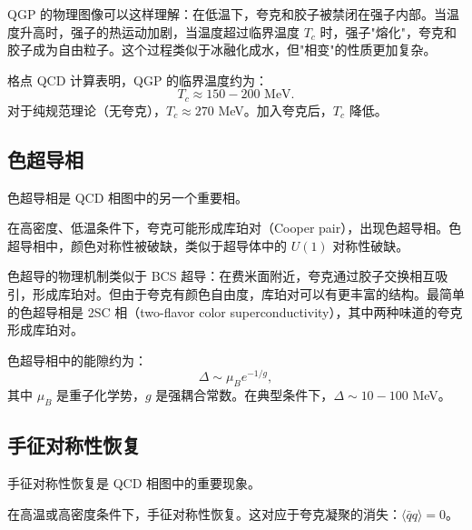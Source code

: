 \begin{remark}
QGP 的物理图像可以这样理解：在低温下，夸克和胶子被禁闭在强子内部。当温度升高时，强子的热运动加剧，当温度超过临界温度 $T_c$ 时，强子"熔化"，夸克和胶子成为自由粒子。这个过程类似于冰融化成水，但"相变"的性质更加复杂。
\end{remark}

\begin{proposition}
格点 QCD 计算表明，QGP 的临界温度约为：
\begin{equation}
    T_c \approx 150-200 \text{ MeV}.
\end{equation}
对于纯规范理论（无夸克），$T_c \approx 270$ MeV。加入夸克后，$T_c$ 降低。
\end{proposition}

\subsection{色超导相}

色超导相是 QCD 相图中的另一个重要相。

\begin{definition}[色超导]
在高密度、低温条件下，夸克可能形成库珀对（Cooper pair），出现色超导相。色超导相中，颜色对称性被破缺，类似于超导体中的 $U(1)$ 对称性破缺。
\end{definition}

\begin{remark}
色超导的物理机制类似于 BCS 超导：在费米面附近，夸克通过胶子交换相互吸引，形成库珀对。但由于夸克有颜色自由度，库珀对可以有更丰富的结构。最简单的色超导相是 2SC 相（two-flavor color superconductivity），其中两种味道的夸克形成库珀对。
\end{remark}

\begin{proposition}[色超导能隙]
色超导相中的能隙约为：
\begin{equation}
    \Delta \sim \mu_B e^{-1/g},
\end{equation}
其中 $\mu_B$ 是重子化学势，$g$ 是强耦合常数。在典型条件下，$\Delta \sim 10-100$ MeV。
\end{proposition}

\subsection{手征对称性恢复}

手征对称性恢复是 QCD 相图中的重要现象。

\begin{definition}[手征对称性恢复]
在高温或高密度条件下，手征对称性恢复。这对应于夸克凝聚的消失：$\langle \bar{q}q \rangle = 0$。
\end{definition}

